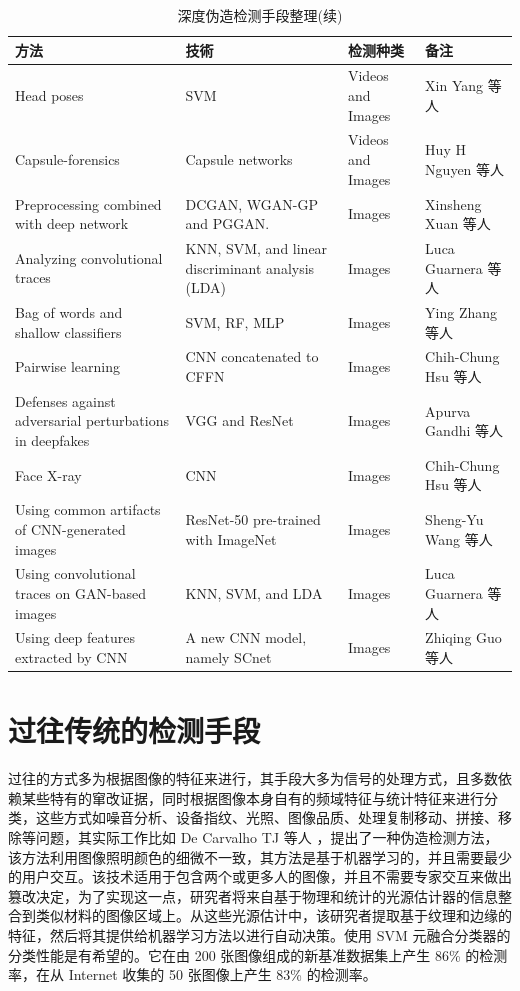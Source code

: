 \begin{table}[ht]
  \caption{深度伪造检测手段整理(续)}
  \label{Tab:bookRWCal}
  \centering
  \begin{tabular}{p{3cm}p{3cm}p{3cm}p{3cm}}
  \toprule
  \textbf{方法} &\textbf{技術} &\textbf{检测种类}&\textbf{备注}\\
  \midrule
 Head poses & SVM & Videos and Images & Xin Yang 等人\\
 Capsule-forensics & Capsule networks & Videos and Images & Huy H Nguyen 等人\\
 Preprocessing combined with deep network & DCGAN, WGAN-GP and PGGAN. & Images & Xinsheng Xuan 等人\\
 Analyzing convolutional traces & KNN, SVM, and linear discriminant analysis (LDA) & Images &  Luca Guarnera 等人\\
 Bag of words and shallow classifiers & SVM, RF, MLP & Images & Ying Zhang 等人\\
 Pairwise learning & CNN concatenated to CFFN & Images & Chih-Chung Hsu 等人\\
 Defenses against adversarial perturbations in deepfakes & VGG and ResNet & Images &  Apurva Gandhi 等人\\
 Face X-ray & CNN & Images & Chih-Chung Hsu 等人\\
 Using common artifacts of CNN-generated images & ResNet-50 pre-trained with ImageNet & Images & Sheng-Yu Wang 等人\\
 Using convolutional traces on GAN-based images & KNN, SVM, and LDA & Images & Luca Guarnera 等人\\
 Using deep features extracted by CNN & A new CNN model, namely SCnet & Images & Zhiqing Guo 等人\\
  \bottomrule
  \end{tabular}
\end{table}

\section{过往传统的检测手段}

过往的方式多为根据图像的特征来进行，其手段大多为信号的处理方式，且多数依赖某些特有的窜改证据，同时根据图像本身自有的频域特征与统计特征来进行分类，这些方式如噪音分析、设备指纹、光照、图像品质、处理复制移动、拼接、移除等问题，其实际工作比如 De Carvalho TJ 等人 \cite{de2013exposing}，提出了一种伪造检测方法，该方法利用图像照明颜色的细微不一致，其方法是基于机器学习的，并且需要最少的用户交互。该技术适用于包含两个或更多人的图像，并且不需要专家交互来做出篡改决定，为了实现这一点，研究者将来自基于物理和统计的光源估计器的信息整合到类似材料的图像区域上。从这些光源估计中，该研究者提取基于纹理和边缘的特征，然后将其提供给机器学习方法以进行自动决策。使用 SVM 元融合分类器的分类性能是有希望的。它在由 200 张图像组成的新基准数据集上产生 86\% 的检测率，在从 Internet 收集的 50 张图像上产生 83\% 的检测率。


